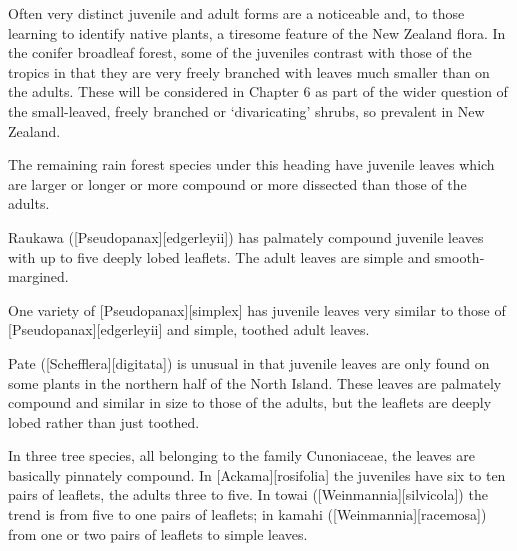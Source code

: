 Often very distinct juvenile and adult forms are a noticeable and, to those learning to identify native plants, a tiresome feature of the New Zealand flora.
In the conifer broadleaf forest, some of the juveniles contrast with those of the tropics in that they are very freely branched with leaves much smaller than on the adults.
These will be considered in Chapter 6 as part of the wider question of the small-leaved, freely branched or `divaricating' shrubs, so prevalent in New Zealand.

The remaining rain forest species under this heading have juvenile leaves which are larger or longer or more compound or more dissected than those of the adults.

Raukawa ([Pseudopanax][edgerleyii]) has palmately compound juvenile leaves with up to five deeply lobed leaflets.
The adult leaves are simple and smooth-margined.

One variety of [Pseudopanax][simplex] has juvenile leaves very similar to those of [Pseudopanax][edgerleyii] and simple, toothed adult leaves.

Pate ([Schefflera][digitata]) is unusual in that juvenile leaves are only found on some plants in the northern half of the North Island.
These leaves are palmately compound and similar in size to those of the adults, but the leaflets are deeply lobed rather than just toothed.

In three tree species, all belonging to the family Cunoniaceae, the leaves are basically pinnately compound.
In [Ackama][rosifolia] the juveniles have six to ten pairs of leaflets, the adults three to five.
In towai ([Weinmannia][silvicola]) the trend is from five to one pairs of leaflets; in kamahi ([Weinmannia][racemosa]) from one or two pairs of leaflets to simple leaves.

